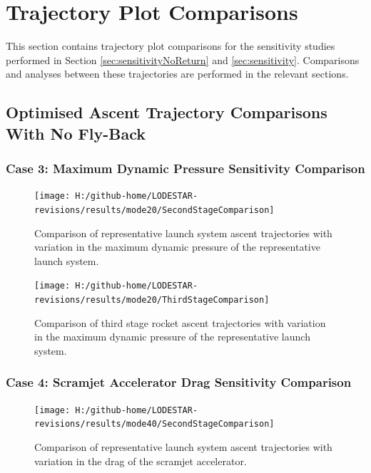 		
		\chapter{Trajectory Plot Comparisons}\label{sec:Appendix_trajectorycomparisons}
		
		
This section contains trajectory plot comparisons for the sensitivity studies performed in Section \ref{sec:sensitivityNoReturn} and \ref{sec:sensitivity}. Comparisons and analyses between these trajectories are performed in the relevant sections. 
		\clearpage
		\section{Optimised Ascent Trajectory Comparisons With No Fly-Back}
		
		\subsection{Case 3: Maximum Dynamic Pressure Sensitivity Comparison}\label{sec:app_comparison20}
		
		
\begin{figure}[!ht]
\centering
\texttt{[image: H:/github-home/LODESTAR-revisions/results/mode20/SecondStageComparison]}
\caption{Comparison of representative launch system ascent trajectories with variation in the maximum dynamic pressure of the representative launch system.}
\label{fig:SecondStageComparison1}
\end{figure}

\begin{figure}[!th]
\centering
\texttt{[image: H:/github-home/LODESTAR-revisions/results/mode20/ThirdStageComparison]}
\caption{Comparison of third stage rocket ascent trajectories with variation in the maximum dynamic pressure of the representative launch system.}
\label{fig:ThirdStageComparison1}
\end{figure}
\FloatBarrier

\clearpage

\subsection{Case 4: Scramjet Accelerator Drag Sensitivity Comparison}\label{sec:app_comparison40}

\begin{figure}[!th]
\centering
\texttt{[image: H:/github-home/LODESTAR-revisions/results/mode40/SecondStageComparison]}
\caption{Comparison of representative launch system ascent trajectories with variation in the drag of the scramjet accelerator.}
\label{fig:SecondStageComparison3}
\end{figure}

